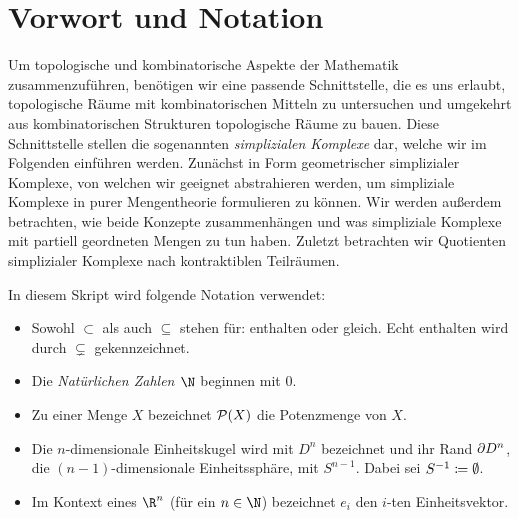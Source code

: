 
\chapter{Vorwort und Notation}
Um topologische und kombinatorische Aspekte der Mathematik zusammenzuführen,
benötigen wir eine passende Schnittstelle, die es uns erlaubt, topologische
Räume mit kombinatorischen Mitteln zu untersuchen und umgekehrt aus
kombinatorischen Strukturen topologische Räume zu bauen. Diese Schnittstelle
stellen die sogenannten \emph{simplizialen Komplexe} dar, welche wir im
Folgenden einführen werden. Zunächst in Form geometrischer simplizialer
Komplexe, von welchen wir geeignet abstrahieren werden, um simpliziale Komplexe
in purer Mengentheorie formulieren zu können. Wir werden außerdem betrachten,
wie beide Konzepte zusammenhängen und was simpliziale Komplexe mit partiell
geordneten Mengen zu tun haben. Zuletzt betrachten wir Quotienten simplizialer
Komplexe nach kontraktiblen Teilräumen.


\bigskip
In diesem Skript wird folgende Notation verwendet:
\begin{itemize}
    \item
        Sowohl $\subset$ als auch $\subseteq$ stehen für: enthalten oder gleich.
        Echt enthalten wird durch $\subsetneq$ gekennzeichnet.
    
    \item
        Die \emph{Natürlichen Zahlen $\N$} beginnen mit $0$.
        
    \item
        Zu einer Menge $X$ bezeichnet $\operatorname{\mathcal{P}}(X)$ die Potenzmenge von $X$.

    \item %
        Die $n$-dimensionale Einheitskugel wird mit $D^n$ bezeichnet und
        ihr Rand $\partial D^n$, 
        die $(n{-}1)$-dimensionale Einheitssphäre, mit $S^{n-1}$.
        Dabei sei $S^{-1} \coloneqq \emptyset$.
        
    \item
        Im Kontext eines $\R^n$ (für ein $n\in\N$) bezeichnet $e_i$ den $i$-ten
        Einheitsvektor.
\end{itemize}










